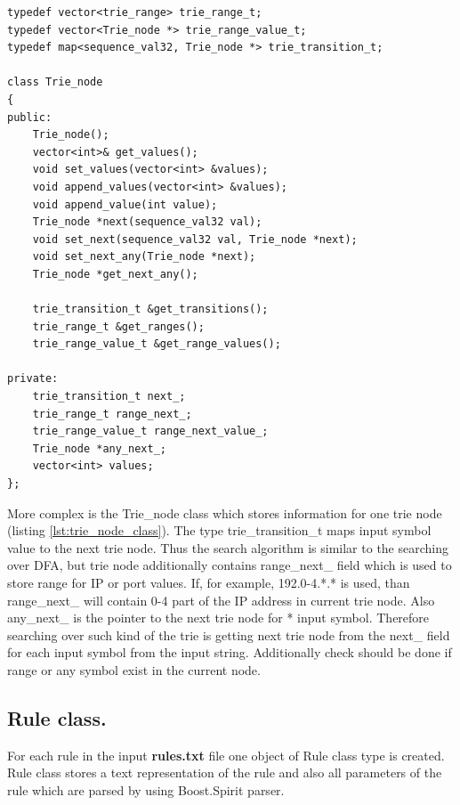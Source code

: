 \documentclass[thesis=M,english]{FITthesis}[2011/07/15]
\begin{document}
\begin{lstlisting}
typedef vector<trie_range> trie_range_t;
typedef vector<Trie_node *> trie_range_value_t;
typedef map<sequence_val32, Trie_node *> trie_transition_t;

class Trie_node
{
public:
    Trie_node();
    vector<int>& get_values();
    void set_values(vector<int> &values);
    void append_values(vector<int> &values);
    void append_value(int value);
    Trie_node *next(sequence_val32 val);
    void set_next(sequence_val32 val, Trie_node *next);
    void set_next_any(Trie_node *next);
    Trie_node *get_next_any();

    trie_transition_t &get_transitions();
    trie_range_t &get_ranges();
    trie_range_value_t &get_range_values();

private:
    trie_transition_t next_;
    trie_range_t range_next_;
    trie_range_value_t range_next_value_;
    Trie_node *any_next_;
    vector<int> values;
};
\end{lstlisting}

More complex is the Trie\_node class which stores information for one trie node (listing \ref{lst:trie_node_class}). The type trie\_transition\_t maps input symbol value to the next trie node. Thus the search algorithm is similar to the searching over DFA, but trie node additionally contains range\_next\_ field which is used to store range for IP or port values. If, for example, 192.0-4.*.* is used, than range\_next\_ will contain 0-4 part of the IP address in current trie node. Also any\_next\_ is the pointer to the next trie node for * input symbol. Therefore searching over such kind of the trie is getting next trie node from the next\_ field for each input symbol from the input string. Additionally check should be done if range or any symbol exist in the current node.

\subsection{Rule class.}
For each rule in the input \textbf{rules.txt} file one object of Rule class type is created. Rule class stores a text representation of the rule and also all parameters of the rule which are parsed by using Boost.Spirit parser.
\end{document}
